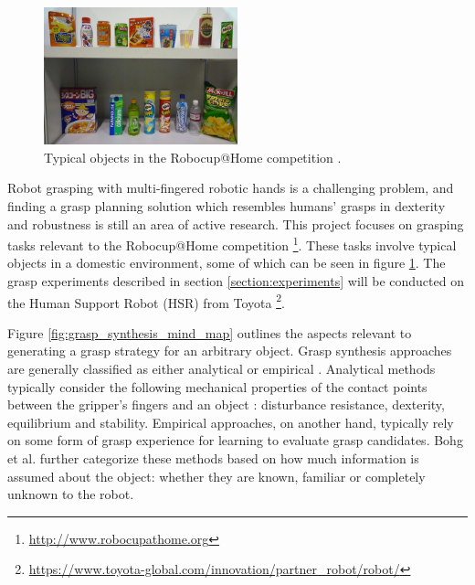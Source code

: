 \documentclass[runningheads]{../llncs}
\begin{document}
\begin{figure}[h!]
    \centering
    \includegraphics[width=0.5\textwidth]{robocup_typical_objects}
    \caption{Typical objects in the Robocup@Home competition \cite{robocupRulebook2018}.}
    \label{fig:robocup_objects}
\end{figure}

Robot grasping with multi-fingered robotic hands is a challenging problem, and finding a grasp planning solution which
resembles humans' grasps in dexterity and robustness is still an area of active research. This project focuses on
grasping tasks relevant to the Robocup@Home competition \footnote{\url{http://www.robocupathome.org}}. These tasks
involve typical objects in a domestic environment, some of which can be seen in figure \ref{fig:robocup_objects}. The
grasp experiments described in section \ref{section:experiments} will be conducted on the Human Support Robot (HSR)
from Toyota \footnote{\url{https://www.toyota-global.com/innovation/partner_robot/robot/}}.

Figure \ref{fig:grasp_synthesis_mind_map} outlines the aspects relevant to generating a grasp strategy for an arbitrary
object. Grasp synthesis approaches are generally classified as either analytical or empirical \cite{Sahbani2012}.
Analytical methods typically consider the following mechanical properties of the contact points between the gripper's
fingers and an object \cite{Roa2015,Sahbani2012,Shimoga1996}: disturbance resistance, dexterity, equilibrium and
stability. Empirical approaches, on another hand, typically rely on some form of grasp experience for learning to
evaluate grasp candidates. Bohg et al. \cite{Bohg2014} further categorize these methods based on how much information
is assumed about the object: whether they are known, familiar or completely unknown to the robot.
\end{document}
